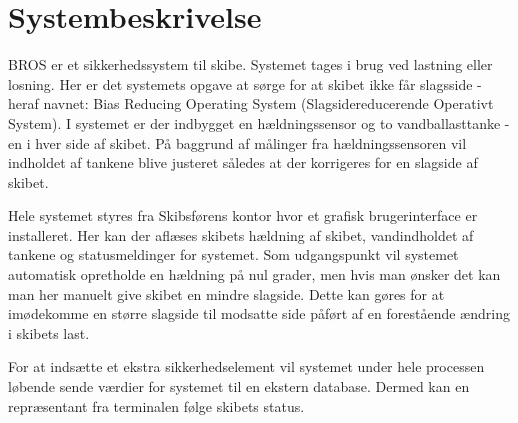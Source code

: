 \chapter{Systembeskrivelse}
BROS er et sikkerhedssystem til skibe. Systemet tages i brug ved lastning eller losning. Her er det systemets opgave at sørge for at skibet ikke får slagsside - heraf navnet: Bias Reducing Operating System (Slagsidereducerende Operativt System).
I systemet er der indbygget en hældningssensor og to vandballasttanke - en i hver side af skibet. På baggrund af målinger fra hældningssensoren vil indholdet af tankene blive justeret således at der korrigeres for en slagside af skibet.

Hele systemet styres fra Skibsførens kontor hvor et grafisk brugerinterface er installeret. Her kan der aflæses skibets hældning af skibet, vandindholdet af tankene og statusmeldinger for systemet.
Som udgangspunkt vil systemet automatisk opretholde en hældning på nul grader, men hvis man ønsker det kan man her manuelt give skibet en mindre slagside. Dette kan gøres for at imødekomme en større slagside til modsatte side påført af en forestående ændring i skibets last.

For at indsætte et ekstra sikkerhedselement vil systemet under hele processen løbende sende værdier for systemet til en ekstern database. Dermed kan en repræsentant fra terminalen følge skibets status.